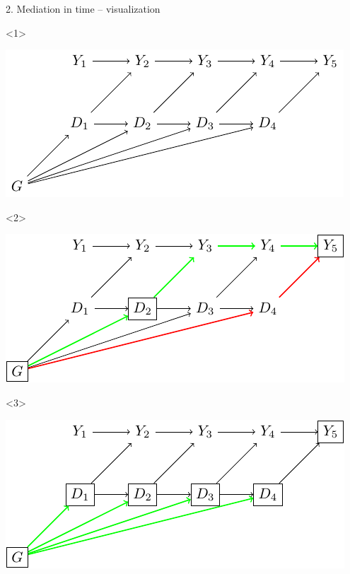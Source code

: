 \documentclass{beamer}\usepackage{listings}
\begin{document}
\begin{frame}[label={sec:org8730378}]{2. Mediation in time -- visualization}
\begin{onlyenv}<1>
\begin{center}
\includegraphics[width=.9\linewidth]{./figs/med-system.pdf}
\end{center}
\end{onlyenv}

\begin{onlyenv}<2>
\begin{center}
\includegraphics[width=.9\linewidth]{./figs/med-discrete-obs.pdf}
\end{center}
\end{onlyenv}

\begin{onlyenv}<3>
\begin{center}
\includegraphics[width=.9\linewidth]{./figs/med-long1.pdf}
\end{center}
\end{onlyenv}


\end{frame}
\end{document}
